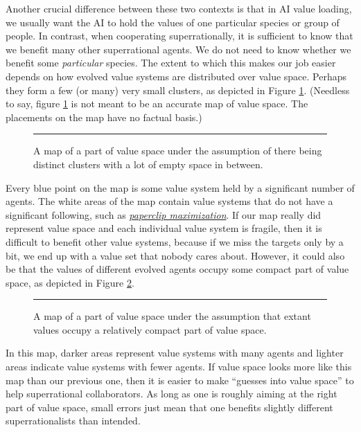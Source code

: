 Another crucial difference between these two contexts is that in AI
value loading, we usually want the AI to hold the values of one
particular species or group of people. In contrast, when cooperating
superrationally, it is sufficient to know that we benefit many other
superrational agents. We do not need to know whether we benefit some
\emph{particular} species. The extent to which this makes our job easier
depends on how evolved value systems are distributed over value space.
Perhaps they form a few (or many) very small clusters, as depicted in
Figure \ref{map-of-value-space-with-clusters}.
(Needless to say, figure
\ref{map-of-value-space-with-clusters} is not meant to
be an accurate map of value space. The placements on the map have no
factual basis.)

\begin{figure}[h!]
    \centering
    \rule{2cm}{2cm}
    \caption{A map of a part of value
space under the assumption of there being distinct clusters with a lot
of empty space in between.}
    \label{map-of-value-space-with-clusters}
\end{figure}

Every blue point on the map is some value system held by a significant
number of agents. The white areas of the map contain value systems that
do not have a significant following, such as
\href{https://wiki.lesswrong.com/wiki/Paperclip_maximizer}{\emph{paperclip
maximization}}. If our map really did represent value space and each
individual value system is fragile, then it is difficult to benefit
other value systems, because if we miss the targets only by a bit, we
end up with a value set that nobody cares about. However, it could also
be that the values of different evolved agents occupy some compact part
of value space, as depicted in Figure
\ref{map-of-value-space-compact}.

\begin{figure}[h!]
    \centering
    \rule{2cm}{2cm}
    \caption{A map of a part of value space under the assumption that extant values occupy a
    relatively compact part of value space.}
    \label{map-of-value-space-compact}
\end{figure}

In this map, darker areas represent value systems with many agents and
lighter areas indicate value systems with fewer agents. If value space
looks more like this map than our previous one, then it is easier to
make ``guesses into value space'' to help superrational collaborators.
As long as one is roughly aiming at the right part of value space, small
errors just mean that one benefits slightly different superrationalists
than intended.

